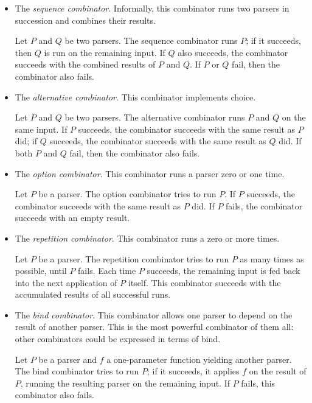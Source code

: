 \documentclass[11pt, american, draft]{PhdThesis}
\begin{document}
  \begin{itemize}[noitemsep,topsep=0pt]
    \item The \emph{sequence combinator}. Informally, this combinator runs two parsers in succession
    and combines their results.

    Let $P$ and $Q$ be two parsers. The sequence combinator runs $P$; if it succeeds, then $Q$ is
    run on the remaining input. If $Q$ also succeeds, the combinator succeeds with the combined
    results of $P$ and $Q$. If $P$ or $Q$ fail, then the combinator also fails.

    \item The \emph{alternative combinator}. This combinator implements choice.

    Let $P$ and $Q$ be two parsers. The alternative combinator runs $P$ and $Q$ on the same input.
    If $P$ succeeds, the combinator succeeds with the same result as $P$ did; if $Q$ succeeds, the
    combinator succeeds with the same result as $Q$ did. If both $P$ and $Q$ fail, then the
    combinator also fails.

    \item The \emph{option combinator}. This combinator runs a parser zero or one time.

    Let $P$ be a parser. The option combinator tries to run $P$. If $P$ succeeds, the combinator
    succeeds with the same result as $P$ did. If $P$ fails, the combinator succeeds with an empty
    result.

    \item The \emph{repetition combinator}. This combinator runs a zero or more times.

    Let $P$ be a parser. The repetition combinator tries to run $P$ as many times as possible, until
    $P$ fails. Each time $P$ succeeds, the remaining input is fed back into the next application of
    $P$ itself. This combinator succeeds with the accumulated results of all successful runs.

    \item The \emph{bind combinator}. This combinator allows one parser to depend on the result of
    another parser. This is the most powerful combinator of them all: other combinators could be
    expressed in terms of bind.

    Let $P$ be a parser and $f$ a one-parameter function yielding another parser. The bind
    combinator tries to run $P$; if it succeeds, it applies $f$ on the result of $P$, running the
    resulting parser on the remaining input. If $P$ fails, this combinator also fails.
  \end{itemize}
\end{document}
